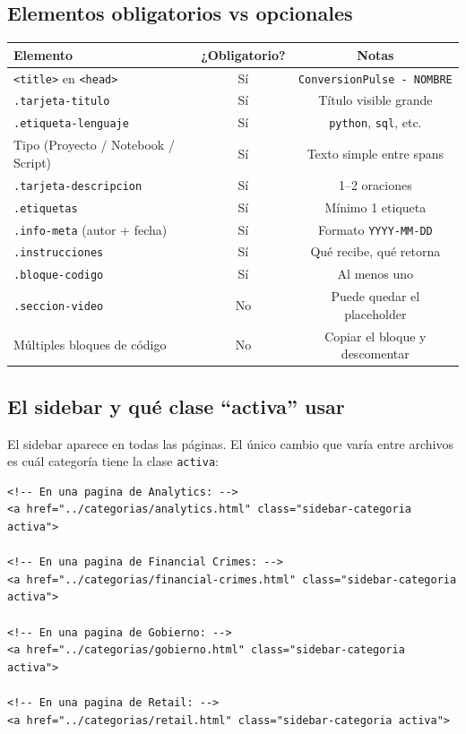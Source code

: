 \documentclass[12pt, a4paper]{article}
\newcommand{\clase}[1]{\texttt{\textcolor{cpAzul}{.#1}}}
\newcommand{\etiquetaHtml}[1]{\texttt{\textcolor{cpKeyword}{<#1>}}}
\newcommand{\codigo}[1]{\texttt{\small #1}}
\begin{document}
\subsection{Elementos obligatorios vs opcionales}

\begin{center}
\begin{tabular}{lcc}
\toprule
\textbf{Elemento} & \textbf{¿Obligatorio?} & \textbf{Notas} \\
\midrule
\etiquetaHtml{title} en \etiquetaHtml{head}     & Sí & \texttt{ConversionPulse - NOMBRE} \\
\clase{tarjeta-titulo}                           & Sí & Título visible grande \\
\clase{etiqueta-lenguaje}                        & Sí & \texttt{python}, \texttt{sql}, etc. \\
Tipo (Proyecto / Notebook / Script)              & Sí & Texto simple entre spans \\
\clase{tarjeta-descripcion}                      & Sí & 1--2 oraciones \\
\clase{etiquetas}                                & Sí & Mínimo 1 etiqueta \\
\clase{info-meta} (autor + fecha)                & Sí & Formato \texttt{YYYY-MM-DD} \\
\clase{instrucciones}                            & Sí & Qué recibe, qué retorna \\
\clase{bloque-codigo}                            & Sí & Al menos uno \\
\clase{seccion-video}                            & No & Puede quedar el placeholder \\
Múltiples bloques de código                      & No & Copiar el bloque y descomentar \\
\bottomrule
\end{tabular}
\end{center}

\subsection{El sidebar y qué clase ``activa'' usar}

El sidebar aparece en todas las páginas. El único cambio que varía entre
archivos es cuál categoría tiene la clase \codigo{activa}:

\begin{lstlisting}[style=htmlstyle, caption={Activar la categoría correcta en el sidebar}]
<!-- En una pagina de Analytics: -->
<a href="../categorias/analytics.html" class="sidebar-categoria activa">

<!-- En una pagina de Financial Crimes: -->
<a href="../categorias/financial-crimes.html" class="sidebar-categoria activa">

<!-- En una pagina de Gobierno: -->
<a href="../categorias/gobierno.html" class="sidebar-categoria activa">

<!-- En una pagina de Retail: -->
<a href="../categorias/retail.html" class="sidebar-categoria activa">
\end{lstlisting}
\end{document}
